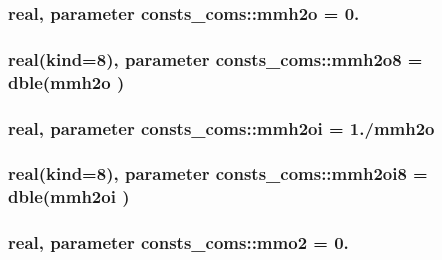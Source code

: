 \subsubsection[{\texorpdfstring{mmh2o}{mmh2o}}]{\setlength{\rightskip}{0pt plus 5cm}real, parameter consts\+\_\+coms\+::mmh2o = 0.}\hypertarget{namespaceconsts__coms_a613dd19deda61e084a0a1c445c059339}{}\label{namespaceconsts__coms_a613dd19deda61e084a0a1c445c059339}
\subsubsection[{\texorpdfstring{mmh2o8}{mmh2o8}}]{\setlength{\rightskip}{0pt plus 5cm}real(kind=8), parameter consts\+\_\+coms\+::mmh2o8 = dble({\bf mmh2o} )}\hypertarget{namespaceconsts__coms_a16b37e1505a8cc5ff91964cc28d72346}{}\label{namespaceconsts__coms_a16b37e1505a8cc5ff91964cc28d72346}
\subsubsection[{\texorpdfstring{mmh2oi}{mmh2oi}}]{\setlength{\rightskip}{0pt plus 5cm}real, parameter consts\+\_\+coms\+::mmh2oi = 1./{\bf mmh2o}}\hypertarget{namespaceconsts__coms_ac580048533c43cb8473dcf3b620c9502}{}\label{namespaceconsts__coms_ac580048533c43cb8473dcf3b620c9502}
\subsubsection[{\texorpdfstring{mmh2oi8}{mmh2oi8}}]{\setlength{\rightskip}{0pt plus 5cm}real(kind=8), parameter consts\+\_\+coms\+::mmh2oi8 = dble({\bf mmh2oi} )}\hypertarget{namespaceconsts__coms_aab0676d97b330f74a5658cc5436518b2}{}\label{namespaceconsts__coms_aab0676d97b330f74a5658cc5436518b2}
\subsubsection[{\texorpdfstring{mmo2}{mmo2}}]{\setlength{\rightskip}{0pt plus 5cm}real, parameter consts\+\_\+coms\+::mmo2 = 0.}\hypertarget{namespaceconsts__coms_a5f6f1ee45767d7fcd7c397df0631feab}{}\label{namespaceconsts__coms_a5f6f1ee45767d7fcd7c397df0631feab}
